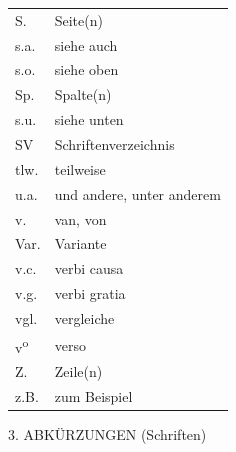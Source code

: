 \begin{longtable}{ll}
S. & Seite(n)\\
s.a. & siehe auch\\
s.o. & siehe oben\\
Sp. & Spalte(n)\\
s.u. & siehe unten\\
SV & Schriftenverzeichnis\\
tlw. & teilweise\\
u.a. & und andere, unter anderem\\
v. & van, von\\
Var. & Variante\\
v.c. & verbi causa\\
v.g. & verbi gratia\\
vgl. & vergleiche\\
v\textsuperscript{o} & verso\\
Z. & Zeile(n)\\
z.B. & zum Beispiel
\end{longtable}
\vspace{2.0ex}
\noindent\footnotesize{\uppercase{3. Abk\"{u}rzungen} (Schriften)}\par
\vspace{2.0ex}

